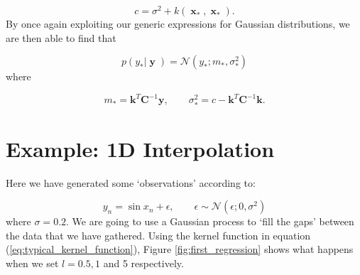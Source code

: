 \documentclass[a4paper, 11pt]{article}
\DeclareMathOperator{\x}{\boldsymbol{x}}
\DeclareMathOperator{\y}{\boldsymbol{y}}
\begin{document}
\begin{equation}
	c 	= \sigma^2 + k(\x_*,\x_*).
\end{equation}
By once again exploiting our generic expressions for Gaussian distributions, we are then able to find that

\begin{equation}
	p(y_*|\y) = \mathcal{N}(y_*;m_*,\sigma_*^2)
\end{equation}
where

\begin{equation}
	m_* = \boldsymbol{k}^T\boldsymbol{C}^{-1}\boldsymbol{y}, \qquad \sigma_*^2 = c-\boldsymbol{k}^T\boldsymbol{C}^{-1}\boldsymbol{k}.
\end{equation}

\section{Example: 1D Interpolation}
Here we have generated some `observations' according to:

\begin{equation}
	y_n = \sin x_n + \epsilon, \qquad \epsilon \sim \mathcal{N}(\epsilon;0,\sigma^2)
\end{equation}
where $\sigma = 0.2$. We are going to use a Gaussian process to `fill the gaps' between the data that we have gathered. Using the kernel function in equation (\ref{eq:typical_kernel_function}), Figure \ref{fig:first_regression} shows what happens when we set $l =0.5,1$ and 5 respectively.\\
\end{document}
